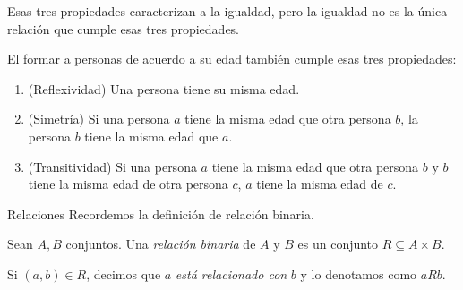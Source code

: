 \begin{frame}
    Esas tres propiedades caracterizan a la igualdad, pero la igualdad no es la única relación que cumple esas tres propiedades.\par 
    El formar a personas de acuerdo a su edad también cumple esas tres propiedades:
    \begin{enumerate}
        \item (Reflexividad) Una persona tiene su misma edad.
        \item (Simetría) Si una persona $a$ tiene la misma edad que otra persona $b$, la persona $b$ tiene la misma edad que $a$.
        \item (Transitividad) Si una persona $a$ tiene la misma edad que otra persona $b$ y $b$ tiene la misma edad de otra persona $c$, $a$ tiene la misma edad de $c$.
    \end{enumerate}
\end{frame}
\begin{frame}{Relaciones}
    Recordemos la definición de relación binaria.
    \begin{mdefinition}
        Sean $A, B$ conjuntos. Una \emph{relación binaria} de $A$ y $B$ es un conjunto $R\subseteq A\times B$.\par 
        Si $(a, b)\in R$, decimos que $a$ \emph{está relacionado con} $b$ y lo denotamos como $aRb$.
    \end{mdefinition}
\end{frame}
